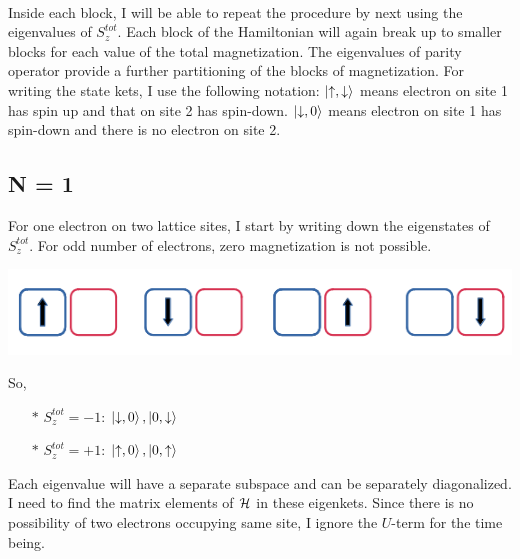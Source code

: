 \documentclass[12pt]{article}
\begin{document}
\paragraph{}
Inside each block, I will be able to repeat the procedure by next using the eigenvalues of \(S_z^{tot}\). Each block of the Hamiltonian will again break up to smaller blocks for each value of the total magnetization. The eigenvalues of parity operator provide a further partitioning of the blocks of magnetization. For writing the state kets, I use the following notation: \(\ket{\uparrow,\downarrow}\) means electron on site 1 has spin up and that on site 2 has spin-down. \(\ket{\downarrow, 0}\) means electron on site 1 has spin-down and there is no electron on site 2.

\subsection{N = 1}

\pp For one electron on two lattice sites, I start by writing down the eigenstates of \(S_z^{tot}\). For odd number of electrons, zero magnetization is not possible. 
\begin{center}
	\includegraphics[scale=0.5]{one.png}
\end{center}
So,
\begin{itemize}
	\item[$\ast$] \(S_z^{tot} = -1\): \(\ket{\downarrow,0}, \ket{0, \downarrow}\)
	\item[$\ast$] \(S_z^{tot} = +1\): \(\ket{\uparrow,0}, \ket{0, \uparrow}\)
\end{itemize}
Each eigenvalue will have a separate subspace and can be separately diagonalized. I need to find the matrix elements of \(\mathcal{H}\) in these eigenkets. Since there is no possibility of two electrons occupying same site, I ignore the \(U\)-term for the time being.
\end{document}
